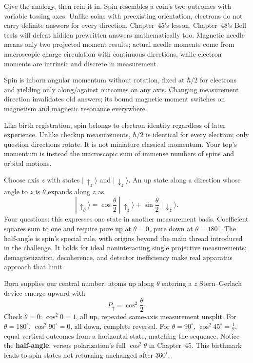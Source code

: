 Give the analogy, then rein it in. Spin resembles a coin's two outcomes with variable tossing axes. Unlike coins with preexisting orientation, electrons do not carry definite answers for every direction, Chapter~45's lesson. Chapter~48's Bell tests will defeat hidden prewritten answers mathematically too. Magnetic needle means only two projected moment results; actual needle moments come from macroscopic charge circulation with continuous directions, while electron moments are intrinsic and discrete in measurement.


\begin{oneline}
Spin is inborn angular momentum without rotation, fixed at $\hbar/2$ for electrons and yielding only along/against outcomes on any axis. Changing measurement direction invalidates old answers; its bound magnetic moment switches on magnetism and magnetic resonance everywhere.
\end{oneline}

Like birth registration, spin belongs to electron identity regardless of later experience. Unlike checkup measurements, $\hbar/2$ is identical for every electron; only question directions rotate. It is not miniature classical momentum. Your top's momentum is instead the macroscopic sum of immense numbers of spins and orbital motions.


Choose axis $z$ with states $|\,{\uparrow}_z\rangle$ and $|\,{\downarrow}_z\rangle$. An up state along a direction whose angle to $z$ is $\theta$ expands along $z$ as
\[
|\,{\uparrow}_\theta\rangle=\cos\frac{\theta}{2}\;|\,{\uparrow}_z\rangle+\sin\frac{\theta}{2}\;|\,{\downarrow}_z\rangle .
\]
Four questions: this expresses one state in another measurement basis. Coefficient squares sum to one and require pure up at $\theta=0$, pure down at $\theta=180^\circ$. The half-angle is spin's special rule, with origins beyond the main thread introduced in the challenge. It holds for ideal noninteracting single projective measurements; demagnetization, decoherence, and detector inefficiency make real apparatus approach that limit.

Born supplies our central number: atoms up along $\theta$ entering a $z$ Stern--Gerlach device emerge upward with
\[
P_{\uparrow}=\cos^{2}\frac{\theta}{2}.
\]
Check $\theta=0$: $\cos^2 0=1$, all up, repeated same-axis measurement unsplit. For $\theta=180^\circ$, $\cos^2 90^\circ=0$, all down, complete reversal. For $\theta=90^\circ$, $\cos^2 45^\circ=\tfrac12$, equal vertical outcomes from a horizontal state, matching the sequence. Notice the \textbf{half-angle}, versus polarization's full $\cos^2\theta$ in Chapter~45. This birthmark leads to spin states not returning unchanged after $360^\circ$.

